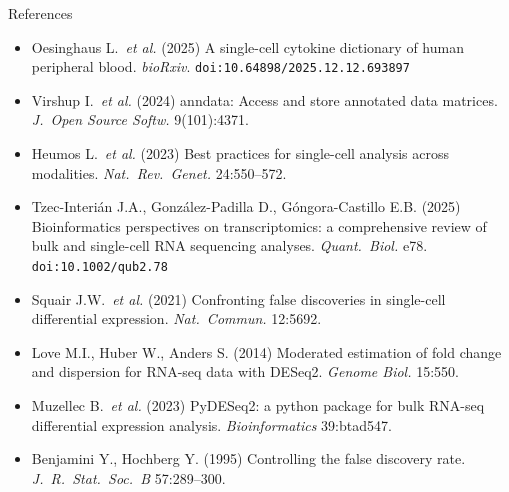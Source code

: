 \documentclass[aspectratio=169,10pt]{beamer}
\begin{document}
\appendix
\begin{frame}{References}
  \scriptsize
  \begin{itemize}\setlength\itemsep{3pt}
    \item Oesinghaus L.\ \emph{et al.} (2025) A single-cell cytokine dictionary of human peripheral blood. \emph{bioRxiv}. \texttt{doi:10.64898/2025.12.12.693897}
    \item Virshup I.\ \emph{et al.} (2024) anndata: Access and store annotated data matrices. \emph{J.\ Open Source Softw.} 9(101):4371.
    \item Heumos L.\ \emph{et al.} (2023) Best practices for single-cell analysis across modalities. \emph{Nat.\ Rev.\ Genet.} 24:550--572.
    \item Tzec-Interi\'an J.A., Gonz\'alez-Padilla D., G\'ongora-Castillo E.B. (2025) Bioinformatics perspectives on transcriptomics: a comprehensive review of bulk and single-cell RNA sequencing analyses. \emph{Quant.\ Biol.} e78. \texttt{doi:10.1002/qub2.78}
    \item Squair J.W.\ \emph{et al.} (2021) Confronting false discoveries in single-cell differential expression. \emph{Nat.\ Commun.} 12:5692.
    \item Love M.I., Huber W., Anders S. (2014) Moderated estimation of fold change and dispersion for RNA-seq data with DESeq2. \emph{Genome Biol.} 15:550.
    \item Muzellec B.\ \emph{et al.} (2023) PyDESeq2: a python package for bulk RNA-seq differential expression analysis. \emph{Bioinformatics} 39:btad547.
    \item Benjamini Y., Hochberg Y. (1995) Controlling the false discovery rate. \emph{J.\ R.\ Stat.\ Soc.\ B} 57:289--300.
  \end{itemize}
\end{frame}
\end{document}
